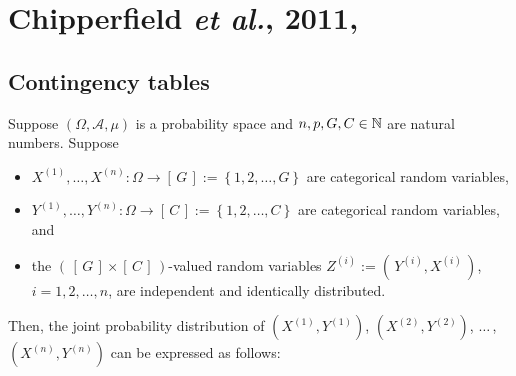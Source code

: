 

\section{Chipperfield \textit{et al.}, 2011, \cite{Chipperfield2011}}
\setcounter{theorem}{0}
\setcounter{equation}{0}

\renewcommand{\theenumi}{\roman{enumi}}
\renewcommand{\labelenumi}{\textnormal{(\theenumi)}$\;\;$}


\subsection{Contingency tables}
Suppose
$\left(\Omega,\mathcal{A},\mu\right)$ is a probability space and
$n, p, G, C \in \mathbb{N}$ are natural numbers.
Suppose
\begin{itemize}
\item
	$X^{(1)}, \ldots, X^{(n)} : \Omega \longrightarrow \left[\,G\,\right] := \left\{1,2,\ldots,G\right\}$
	are categorical random variables,
\item
	$Y^{(1)}, \ldots, Y^{(n)} : \Omega \longrightarrow \left[\,C\,\right] := \left\{1,2,\ldots,C\right\}$
	are categorical random variables, and
\item
	the $\left(\,\left[\,G\,\right] \times \left[\,C\,\right]\,\right)$-valued random variables
	$Z^{(i)} := \left(\,Y^{(i)},X^{(i)}\,\right)$, $i = 1, 2, \ldots, n$, are independent and identically distributed.
\end{itemize}
Then, the joint probability distribution of
$\left(X^{(1)},Y^{(1)}\right)$, $\left(X^{(2)},Y^{(2)}\right)$, $\ldots$\,, $(X^{(n)},Y^{(n)})$
can be expressed as follows:
